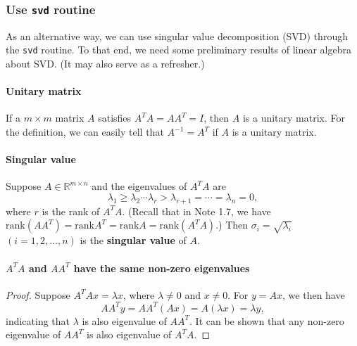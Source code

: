 \documentclass{article}
\begin{document}
\subsubsection{Use \texttt{svd} routine}
As an alternative way, we can use singular value decomposition (SVD) through the \texttt{svd} routine. To that end, we need some preliminary results of linear algebra about SVD. (It may also serve as a refresher.)
\paragraph{Unitary matrix} If a $m\times m$ matrix $A$ satisfies $A^TA=AA^T=I$, then $A$ is a unitary matrix. For the definition, we can easily tell that $A^{-1}=A^T$ if $A$ is a unitary matrix.

\paragraph{Singular value} Suppose $A\in \mathbb{R}^{m\times n}$ and the eigenvalues of $A^TA$ are
\[
\lambda_1\geq\lambda_2\cdots\lambda_r>\lambda_{r+1}=\cdots=\lambda_n=0,
\]
where $r$ is the rank of $A^TA$. (Recall that in Note 1.7, we have $\text{rank}(AA^T)=\text{rank}A^T=\text{rank}A=\text{rank}(A^TA)$.) Then $\sigma_i=\sqrt{\lambda_i}$ $(i=1,2,\ldots,n)$ is the \textbf{singular value} of $A$.

\paragraph{$A^TA$ and $AA^T$ have the same non-zero eigenvalues}
\begin{proof}
Suppose $A^TAx=\lambda x$, where $\lambda\neq 0$ and $x\neq 0$. For $y=Ax$, we then have
\[
AA^Ty=AA^T(Ax)=A(\lambda x)=\lambda y,
\]
indicating that $\lambda$ is also eigenvalue of $AA^T$. It can be shown that any non-zero eigenvalue of $AA^T$ is also eigenvalue of $A^TA$.
\end{proof}
\end{document}

